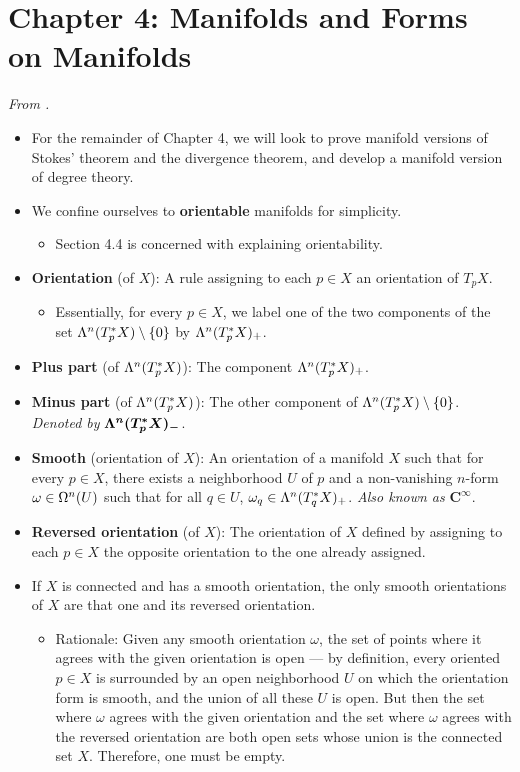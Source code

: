 \documentclass[../notes.tex]{subfiles}
\begin{document}
\section{Chapter 4: Manifolds and Forms on Manifolds}
\emph{From \textcite{bib:DifferentialForms}.}
\begin{itemize}
    \item For the remainder of Chapter 4, we will look to prove manifold versions of Stokes' theorem and the divergence theorem, and develop a manifold version of degree theory.
    \item We confine ourselves to \textbf{orientable} manifolds for simplicity.
    \begin{itemize}
        \item Section 4.4 is concerned with explaining orientability.
    \end{itemize}
    \item \textbf{Orientation} (of $X$): A rule assigning to each $p\in X$ an orientation of $T_pX$.
    \begin{itemize}
        \item Essentially, for every $p\in X$, we label one of the two components of the set $\lam[n]{T_p^*X}\setminus\{0\}$ by $\lam[n]{T_p^*X}_+$.
    \end{itemize}
    \item \textbf{Plus part} (of $\lam[n]{T_p^*X}$): The component $\lam[n]{T_p^*X}_+$.
    \item \textbf{Minus part} (of $\lam[n]{T_p^*X}$): The other component of $\lam[n]{T_p^*X}\setminus\{0\}$. \emph{Denoted by} $\bm{\lam[n]{T_p^*X}_-}$.
    \item \textbf{Smooth} (orientation of $X$): An orientation of a manifold $X$ such that for every $p\in X$, there exists a neighborhood $U$ of $p$ and a non-vanishing $n$-form $\omega\in\ome[n]{U}$ such that for all $q\in U$, $\omega_q\in\lam[n]{T_q^*X}_+$. \emph{Also known as} $\bm{C^\infty}$.
    \item \textbf{Reversed orientation} (of $X$): The orientation of $X$ defined by assigning to each $p\in X$ the opposite orientation to the one already assigned.
    \item If $X$ is connected and has a smooth orientation, the only smooth orientations of $X$ are that one and its reversed orientation.
    \begin{itemize}
        \item Rationale: Given any smooth orientation $\omega$, the set of points where it agrees with the given orientation is open --- by definition, every oriented $p\in X$ is surrounded by an open neighborhood $U$ on which the orientation form is smooth, and the union of all these $U$ is open. But then the set where $\omega$ agrees with the given orientation and the set where $\omega$ agrees with the reversed orientation are both open sets whose union is the connected set $X$. Therefore, one must be empty.

\end{itemize}
\end{itemize}
\end{document}
